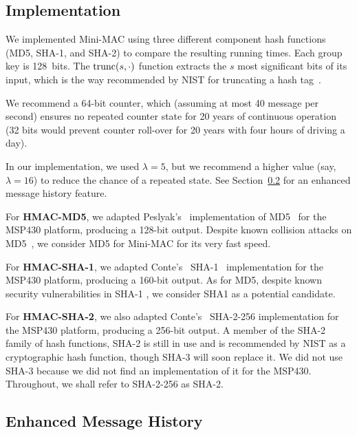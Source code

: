 \subsection{Implementation}
\label{implementation}

We implemented Mini-MAC using three different component hash functions (MD5, SHA-1, and SHA-2) to compare the resulting running times.  
Each group key is 128~bits.  The $\hbox{trunc}(s,\cdot)$ function extracts 
the $s$ most significant bits of its input, which is the way recommended by NIST
for truncating a hash tag~\cite{nist107}.

We recommend a 64-bit counter, which (assuming at most 40 message per second) ensures no repeated counter state for 20 years
of continuous operation (32 bits would prevent counter roll-over for 20 years with four hours of driving a day).

In our implementation, we used $\lambda = 5$, 
but we recommend a higher value (say, $\lambda = 16$) to reduce the chance of a repeated state.
See Section~\ref{history} for an enhanced message history feature.

For \textbf{HMAC-MD5},
we adapted Peslyak's~\cite{Peslyak} implementation of MD5~\cite{MD5} for the MSP430 platform, producing a 128-bit output. 
Despite known collision attacks on MD5~\cite{Wang-MD5}, we consider
MD5 for Mini-MAC for its very fast speed.  

For \textbf{HMAC-SHA-1},
we adapted Conte's~\cite{Conte-SHA1} SHA-1~\cite{FIPS-180-4} implementation for the MSP430 platform, producing a 160-bit output. 
As for MD5, despite known security vulnerabilities in SHA-1 \cite{Wang-SHA1}, 
we consider SHA1 as a potential candidate.


For \textbf{HMAC-SHA-2},
we also adapted Conte's~\cite{Conte-SHA256} SHA-2-256 implementation for the MSP430 platform, producing a 256-bit output. 
A member of the SHA-2 family of hash functions, SHA-2 is still in use and is recommended by NIST as a cryptographic hash function, 
though SHA-3 will soon replace it\cite{FIPS-180-4}. We did not use SHA-3 because we did not find an implementation of it
for the MSP430.  Throughout, we shall refer to SHA-2-256 as SHA-2.


\subsection{Enhanced Message History}
\label{history}


